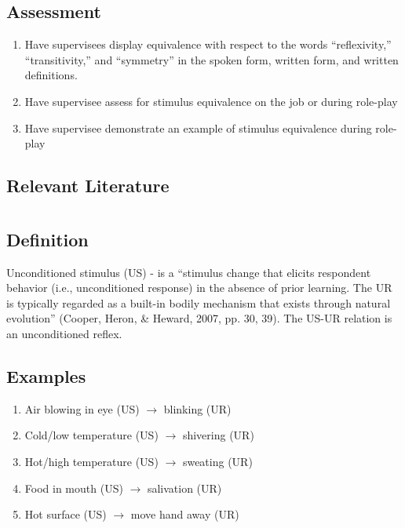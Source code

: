 \subsection{Assessment}
\begin{enumerate}
\item Have supervisees display equivalence with respect to the words ``reflexivity,'' ``transitivity,'' and ``symmetry'' in the spoken form, written form, and written definitions.
\item Have supervisee assess for stimulus equivalence on the job or during role-play 
\item Have supervisee demonstrate an example of stimulus equivalence during role-play
%
\end{enumerate}
%
\subsection{Relevant Literature}
\begin{refsection}
\nocite{cooper2007applied,
        sidman1997equivalence,
        sidman2009equivalence}
\printbibliography[heading=none]
\end{refsection}
%
\clearpage \section{\fourFKThirteen{}}
\subsection{Definition} 
Unconditioned stimulus (US) - is a ``stimulus change that elicits respondent behavior (i.e., unconditioned response) in the absence of prior learning.  The UR is typically regarded as a built-in bodily mechanism that exists through natural evolution'' (Cooper, Heron, \& Heward, 2007, pp. 30, 39).   The US-UR relation is an unconditioned reflex.
%
\subsection{Examples}
\begin{enumerate}
\item Air blowing in eye (US) $\rightarrow$ blinking (UR)
\item Cold/low temperature (US) $\rightarrow$ shivering (UR)
\item Hot/high temperature (US) $\rightarrow$ sweating (UR)
\item Food in mouth (US) $\rightarrow$ salivation (UR)
\item Hot surface (US) $\rightarrow$ move hand away (UR)
%
\end{enumerate}
%
